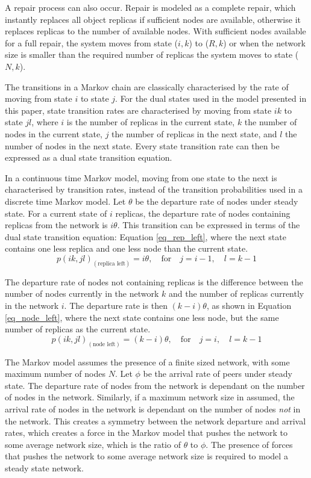 \documentclass[10pt,a4paper,conference]{IEEEtran}
\begin{document}
A repair process can also occur. Repair is modeled as a complete repair, which instantly replaces all object replicas if sufficient nodes are available, otherwise it replaces replicas to the number of available nodes. With sufficient nodes available for a full repair, the system moves from state ($i,k$) to ($R,k$) or when the network size is smaller than the required number of replicas the system moves to state ($N,k$).

The transitions in a Markov chain are classically characterised by the rate of moving from state $i$ to state $j$. For the dual states used in the model presented in this paper, state transition rates are characterised by moving from state $i k$ to state $j l$, where $i$ is the number of replicas in the current state, $k$ the number of nodes in the current state, $j$ the number of replicas in the next state, and $l$ the number of nodes in the next state. Every state transition rate can then be expressed as a dual state transition equation.

In a continuous time Markov model, moving from one state to the next is characterised by transition rates, instead of the transition probabilities used in a discrete time Markov model. Let $\theta$ be the departure rate of nodes under steady state. For a current state of $i$ replicas, the departure rate of nodes containing replicas from the network is $i\theta$. This transition can be expressed in terms of the dual state transition equation: Equation \eqref{eq_rep_left}, where the next state contains one less replica and one less node than the current state.
%
\begin{equation} \label{eq_rep_left}
    p(i k,j l)_{(\textrm{replica left})} = i\theta,\quad\textrm{for}\quad j = i - 1,\quad l = k - 1
\end{equation}

The departure rate of nodes not containing replicas is the difference between the number of nodes currently in the network $k$ and the number of replicas currently in the network $i$. The departure rate is then $(k - i)\theta$, as shown in Equation \eqref{eq_node_left}, where the next state contains one less node, but the same number of replicas as the current state.
%
\begin{equation} \label{eq_node_left}
    p(i k,j l)_{(\textrm{node left})} = (k - i)\theta,\quad\textrm{for}\quad j = i,\quad l = k - 1
\end{equation}

The Markov model assumes the presence of a finite sized network, with some maximum number of nodes $N$. Let $\phi$ be the arrival rate of peers under steady state. The departure rate of nodes from the network is dependant on the number of nodes in the network. Similarly, if a maximum network size in assumed, the arrival rate of nodes in the network is dependant on the number of nodes \emph{not} in the network. This creates a symmetry between the network departure and arrival rates, which creates a force in the Markov model that pushes the network to some average network size, which is the ratio of $\theta$ to $\phi$. The presence of forces that pushes the network to some average network size is required to model a steady state network.
\end{document}
